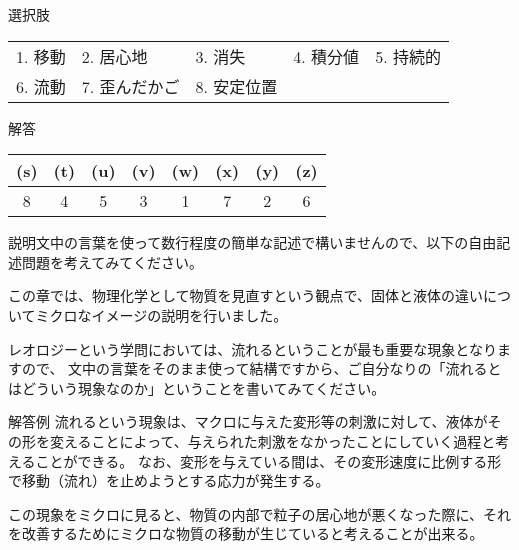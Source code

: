 \documentclass[uplatex,dvipdfmx,a4paper,11pt]{jsarticle}
\begin{document}
\begin{qlist}
		\begin{itembox}[l]{選択肢}
			\begin{center}
				\begin{tabular}{lllll}
					1. 移動	&2. 居心地 	&3. 消失	&4. 積分値	&5. 持続的\\
					6. 流動	&7. 歪んだかご &8. 安定位置
				\end{tabular}
			\end{center}
		\end{itembox}
\end{qlist}

\begin{itembox}[l]{解答}
    \begin{center} 
      \begin{tabular}{|c|c|c|c|c|c|c|c|} \hline
        (s) & (t) & (u) & (v) & (w) & (x) & (y) & (z) \\ \hline
        8 & 4 & 5 & 3 & 1 & 7 & 2 & 6 \\ \hline		
      \end{tabular}
    \end{center}
\end{itembox}

\clearpage

説明文中の言葉を使って数行程度の簡単な記述で構いませんので、以下の自由記述問題を考えてみてください。
\begin{qlist}
\qitem この章では、物理化学として物質を見直すという観点で、固体と液体の違いについてミクロなイメージの説明を行いました。

レオロジーという学問においては、流れるということが最も重要な現象となりますので、
文中の言葉をそのまま使って結構ですから、ご自分なりの「流れるとはどういう現象なのか」ということを書いてみてください。
\end{qlist}

\begin{itembox}[l]{解答例}
    流れるという現象は、マクロに与えた変形等の刺激に対して、液体がその形を変えることによって、与えられた刺激をなかったことにしていく過程と考えることができる。
	なお、変形を与えている間は、その変形速度に比例する形で移動（流れ）を止めようとする応力が発生する。

	この現象をミクロに見ると、物質の内部で粒子の居心地が悪くなった際に、それを改善するためにミクロな物質の移動が生じていると考えることが出来る。
\end{itembox}

\clearpage
\end{document}
